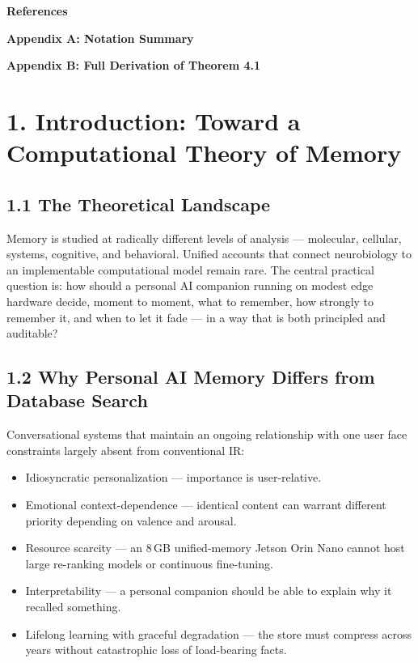 \documentclass[]{article}
\begin{document}
\textbf{References}

\textbf{Appendix A: Notation Summary}

\textbf{Appendix B: Full Derivation of Theorem 4.1}

\hypertarget{introduction-toward-a-computational-theory-of-memory}{%
\section{\texorpdfstring{\textbf{1. Introduction: Toward a Computational
Theory of
Memory}}{1. Introduction: Toward a Computational Theory of Memory}}\label{introduction-toward-a-computational-theory-of-memory}}

\hypertarget{the-theoretical-landscape}{%
\subsection{\texorpdfstring{\textbf{1.1 The Theoretical
Landscape}}{1.1 The Theoretical Landscape}}\label{the-theoretical-landscape}}

Memory is studied at radically different levels of analysis --- molecular,
cellular, systems, cognitive, and behavioral. Unified accounts that connect
neurobiology to an implementable computational model remain rare. The
central practical question is: how should a personal AI companion running
on modest edge hardware decide, moment to moment, what to remember, how
strongly to remember it, and when to let it fade --- in a way that is both
principled and auditable?

\hypertarget{why-personal-ai-memory-differs-from-database-search}{%
\subsection{\texorpdfstring{\textbf{1.2 Why Personal AI Memory Differs
from Database
Search}}{1.2 Why Personal AI Memory Differs from Database Search}}\label{why-personal-ai-memory-differs-from-database-search}}

Conversational systems that maintain an ongoing relationship with one user
face constraints largely absent from conventional IR:

\begin{itemize}
\item Idiosyncratic personalization --- importance is user-relative.
\item Emotional context-dependence --- identical content can warrant
  different priority depending on valence and arousal.
\item Resource scarcity --- an 8\,GB unified-memory Jetson Orin Nano cannot
  host large re-ranking models or continuous fine-tuning.
\item Interpretability --- a personal companion should be able to explain
  why it recalled something.
\item Lifelong learning with graceful degradation --- the store must
  compress across years without catastrophic loss of load-bearing facts.
\end{itemize}
\end{document}
